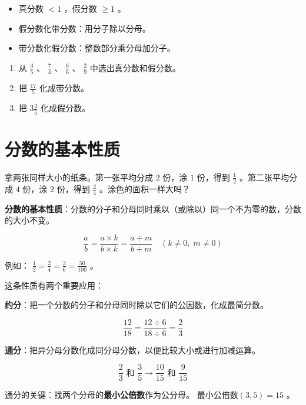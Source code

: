 \begin{keytakeaway}


\begin{itemize}
  \item 真分数 $< 1$ ，假分数 $\geq 1$ 。
  \item 假分数化带分数：用分子除以分母。
  \item 带分数化假分数：整数部分乘分母加分子。
\end{itemize}


\end{keytakeaway}

\begin{practice}


\begin{enumerate}
  \item 从 $\frac{3}{5}$ 、 $\frac{7}{4}$ 、 $\frac{6}{6}$ 、 $\frac{2}{9}$ 中选出真分数和假分数。
  \item 把 $\frac{17}{5}$ 化成带分数。
  \item 把 $3\frac{2}{5}$ 化成假分数。
\end{enumerate}


\end{practice}

\section*{分数的基本性质}


\begin{explore}


拿两张同样大小的纸条。第一张平均分成 $2$ 份，涂 $1$ 份，得到 $\frac{1}{2}$ 。第二张平均分成 $4$ 份，涂 $2$ 份，得到 $\frac{2}{4}$ 。涂色的面积一样大吗？

\end{explore}

\begin{understand}


\textbf{分数的基本性质}：分数的分子和分母同时乘以（或除以）同一个不为零的数，分数的大小不变。

\[
\frac{a}{b} = \frac{a \times k}{b \times k} = \frac{a \div m}{b \div m} \quad (k \neq 0,\; m \neq 0)
\]


例如： $\frac{1}{2} = \frac{2}{4} = \frac{3}{6} = \frac{50}{100}$ 。

这条性质有两个重要应用：

\textbf{约分}：把一个分数的分子和分母同时除以它们的公因数，化成最简分数。

\[
\frac{12}{18} = \frac{12 \div 6}{18 \div 6} = \frac{2}{3}
\]


\textbf{通分}：把异分母分数化成同分母分数，以便比较大小或进行加减运算。

\[
\frac{2}{3} \text{ 和 } \frac{3}{5} \longrightarrow \frac{10}{15} \text{ 和 } \frac{9}{15}
\]


通分的关键：找两个分母的\textbf{最小公倍数}作为公分母。 $\text{最小公倍数}(3, 5) = 15$ 。

\end{understand}

